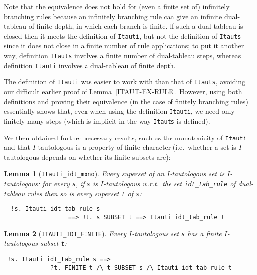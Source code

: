 \documentclass[a4paper]{article}
\newtheorem{lemma}{Lemma}
\begin{document}
Note that the equivalence does not hold for (even a finite set of)
infinitely branching rules because an infinitely branching rule can
give an infinite dual-tableau of finite depth, in which each branch is
finite.  If such a dual-tableau is closed then it meets the definition of
\texttt{Itauti}, but not the definition of \texttt{Itauts} since it
does not close in a finite number of rule applications; to put it
another way, definition \texttt{Itauts} involves a finite number of
dual-tableau steps, whereas definition \texttt{Itauti} involves a dual-tableau
of finite depth.

The definition of \texttt{Itauti} was easier to work with than that of
\texttt{Itauts}, avoiding our difficult earlier proof of 
Lemma~\ref{ITAUT-EX-RULE}.
However, using both definitions and proving their equivalence
(in the case of finitely branching rules) essentially shows that,
even when using the definition \texttt{Itauti}, we need only finitely many steps
(which is implicit in the way \texttt{Itauts} is defined).

We then obtained further necessary results, such as the monotonicity
of \texttt{Itauti} and that $I$-tautologous is a property of finite
character (i.e.\ whether a set is $I$-tautologous depends on whether its
finite subsets are):

\begin{lemma}[\texttt{Itauti\_idt\_mono}] \label{Itauti-idt-mono}
  Every superset of an $I$-tautologous set is $I$-tautologous: for every
  \texttt{s}, if \texttt{s} is $I$-tautologous w.r.t.\ the set
  \texttt{idt\_tab\_rule} of dual-tableau rules then so is every
  superset \texttt{t} of \texttt{s}:
\end{lemma}
\begin{verbatim}
  !s. Itauti idt_tab_rule s 
                  ==> !t. s SUBSET t ==> Itauti idt_tab_rule t
\end{verbatim}

\begin{lemma}[\texttt{ITAUTI\_IDT\_FINITE}]\label{ITAUTI-IDT-FINITE}
Every $I$-tautologous set \texttt{s} has
a finite $I$-tautologous subset \texttt{t}:
\end{lemma}
\begin{verbatim}
 !s. Itauti idt_tab_rule s ==>
             ?t. FINITE t /\ t SUBSET s /\ Itauti idt_tab_rule t
\end{verbatim}
\end{document}
